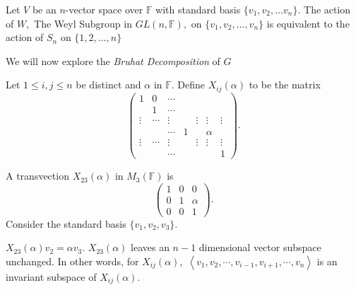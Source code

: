 \begin{proposition}
	Let $V$ be an $n$\nobreakdash-vector space over $\mathbb{F}$ with standard basis $\{ v_1, v_2, \dotsc v_n \}.$ The action of $W,$ The Weyl Subgroup in $GL(n, \mathbb{F}),$ on $\{ v_1, v_2, \dotsc, v_n \}$ is equivalent to the action of $S_n$ on $\{1, 2, \dotsc, n \}$
\end{proposition}

We will now explore the \emph{Bruhat Decomposition} of $G$

\begin{definition}[Transvection]
	Let $1 \leq i,j\leq n$ be distinct and $\alpha$ in $\mathbb{F}.$%
	Define $X_{ij}( \alpha)$ to be the matrix
	$$ \begin{pmatrix}
		1 &  0     &\cdots    &      &    &    &    \\
		    &  1   &\cdots    &      &    &    &    \\
		\vdots     &\cdots    &\vdots&     &\vdots &\vdots &\vdots \\
		    &      &\cdots    &  1   &    &\alpha    &    \\
		\vdots     &\cdots    &\vdots&     &\vdots &\vdots &\vdots \\
		    &      &\cdots    &      &    &    &   1
	\end{pmatrix} .$$
\end{definition}

\begin{example}[Transvection]
	A transvection $X_{23} (\alpha)$ in $M_3(\mathbb{F})$ is
	$$ \begin{pmatrix}
		1 &  0  &  0  \\
		0 &  1  &\alpha\\
		0 &  0  &  1  
	\end{pmatrix}. $$
	Consider the standard basis $ \{ v_1, v_2, v_3 \}.$
\end{example}
$X_{23}( \alpha) v_2 = \alpha v_3.$ $X_{23} (\alpha)$ leaves an $n-1$ dimensional vector subspace unchanged. In other words, for $X_{ij}(\alpha),$ $\left< v_1, v_2, \cdots, v_{i-1}, v_{i+1}, \cdots, v_n \right> $ is an invariant subspace of $X_{ij} ( \alpha).$


